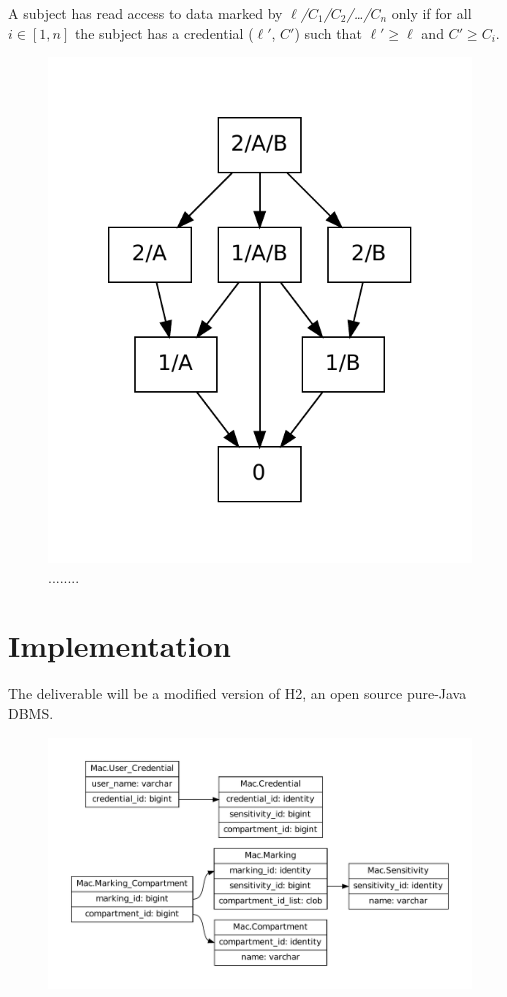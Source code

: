 \documentclass[twocolumn]{article}
\begin{document}
A subject has read access to data marked by {\it $\ell$/$C_1$/$C_2$/\ldots/$C_n$} only if for all $i \in [1, n]$ the subject has a credential ($\ell'$, $C'$) such that $\ell' \ge \ell$ and $C' \ge C_i$.

\begin{figure}
  \begin{center}
    \includegraphics[width=0.75\linewidth]{lattice.pdf}
  \end{center}
  \caption{........}

  \label{fig:lattice}
\end{figure}

\section{Implementation}

The deliverable will be a modified version of H2\cite{h2}, an open source pure-Java DBMS.

\begin{figure}
  \begin{center}
    \includegraphics[width=\linewidth]{mac-schema.pdf}
  \end{center}
\end{figure}
\end{document}
